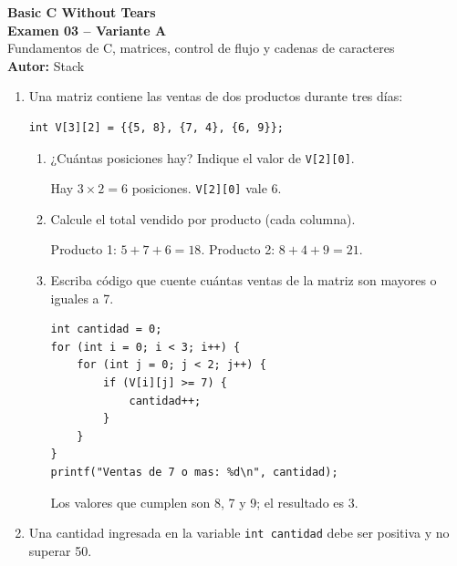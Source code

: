 
\newcommand{\NombreDocumento}{Examen 03 -- Variante A}

\begin{center}
    {\LARGE \textbf{Basic C Without Tears}} \\[0.2cm]
    {\Large \textbf{Examen 03 -- Variante A}} \\[0.12cm]
    \small Fundamentos de C, matrices, control de flujo y cadenas de caracteres \\[0.08cm]
    \textbf{Autor:} Stack
\end{center}
\vspace{0.2cm}
\begin{enumerate}[label=\textbf{\arabic*.}]
\item Una matriz contiene las ventas de dos productos durante tres días:
\begin{lstlisting}[style=customc, numbers=none]
int V[3][2] = {{5, 8}, {7, 4}, {6, 9}};
\end{lstlisting}
\begin{enumerate}[label=(\alph*)]
\item ¿Cuántas posiciones hay? Indique el valor de \texttt{V[2][0]}.
\ifpauta\begin{solucionbox}Hay $3\times2=6$ posiciones. \texttt{V[2][0]} vale 6.\end{solucionbox}\else\vspace{1.5cm}\fi
\item Calcule el total vendido por producto (cada columna).
\ifpauta\begin{solucionbox}Producto 1: $5+7+6=18$. Producto 2: $8+4+9=21$.\end{solucionbox}\else\vspace{2cm}\fi
\item Escriba código que cuente cuántas ventas de la matriz son mayores o iguales a 7.
\ifpauta\begin{solucionbox}\begin{lstlisting}[style=customc]
int cantidad = 0;
for (int i = 0; i < 3; i++) {
    for (int j = 0; j < 2; j++) {
        if (V[i][j] >= 7) {
            cantidad++;
        }
    }
}
printf("Ventas de 7 o mas: %d\n", cantidad);
\end{lstlisting}Los valores que cumplen son 8, 7 y 9; el resultado es 3.\end{solucionbox}\else\vspace{3cm}\fi
\end{enumerate}
\newpage
\item Una cantidad ingresada en la variable \texttt{int cantidad} debe ser positiva y no superar 50.

\end{enumerate}
